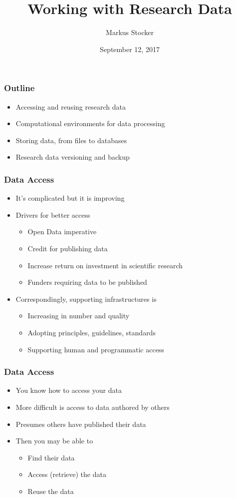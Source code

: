 \documentclass{beamer}
\title{Working with Research Data}
\author{Markus Stocker}
\date{September 12, 2017}
\begin{document}
\maketitle

\begin{frame}
  \frametitle{Outline}
  
  \begin{itemize}
  \item Accessing and reusing research data
  \item Computational environments for data processing
  \item Storing data, from files to databases
  \item Research data versioning and backup
  \end{itemize}
\end{frame}

\begin{frame}
  \frametitle{Data Access}
  
  \begin{itemize}
  \item It's complicated but it is improving
  \item Drivers for better access
  \begin{itemize}
  \item Open Data imperative
  \item Credit for publishing data
  \item Increase return on investment in scientific research
  \item Funders requiring data to be published
  \end{itemize}
  \item Correspondingly, supporting infrastructures is
  \begin{itemize}
  \item Increasing in number and quality
  \item Adopting principles, guidelines, standards
  \item Supporting human and programmatic access
  \end{itemize}
  \end{itemize}
\end{frame}

\begin{frame}
  \frametitle{Data Access}
  
  \begin{itemize}
  \item You know how to access your data
  \item More difficult is access to data authored by others
  \item Presumes others have published their data
  \item Then you may be able to
  \begin{itemize}
  \item Find their data
  \item Access (retrieve) the data
  \item Reuse the data
  \end{itemize}
  \end{itemize}
\end{frame}
\end{document}
